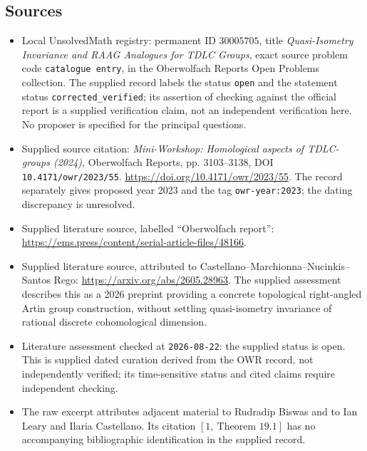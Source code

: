 \documentclass[11pt]{article}
\begin{document}
\subsection{Sources}
\begin{itemize}
\item Local UnsolvedMath registry: permanent ID \(30005705\), title \emph{Quasi-Isometry Invariance and RAAG Analogues for TDLC Groups}, exact source problem code \texttt{catalogue entry}, in the Oberwolfach Reports Open Problems collection. The supplied record labels the status \texttt{open} and the statement status \texttt{corrected\_verified}; its assertion of checking against the official report is a supplied verification claim, not an independent verification here. No proposer is specified for the principal questions.
\item Supplied source citation: \emph{Mini-Workshop: Homological aspects of TDLC-groups (2024)}, Oberwolfach Reports, pp. 3103--3138, DOI \texttt{10.4171/owr/2023/55}. \url{https://doi.org/10.4171/owr/2023/55}. The record separately gives proposed year 2023 and the tag \texttt{owr-year:2023}; the dating discrepancy is unresolved.
\item Supplied literature source, labelled ``Oberwolfach report'': \url{https://ems.press/content/serial-article-files/48166}.
\item Supplied literature source, attributed to Castellano--Marchionna--Nucinkis--Santos Rego: \url{https://arxiv.org/abs/2605.28963}. The supplied assessment describes this as a 2026 preprint providing a concrete topological right-angled Artin group construction, without settling quasi-isometry invariance of rational discrete cohomological dimension.
\item Literature assessment checked at \texttt{2026-08-22}: the supplied status is open. This is supplied dated curation derived from the OWR record, not independently verified; its time-sensitive status and cited claims require independent checking.
\item The raw excerpt attributes adjacent material to Rudradip Biswas and to Ian Leary and Ilaria Castellano. Its citation \([1,\ \text{Theorem }19.1]\) has no accompanying bibliographic identification in the supplied record.
\end{itemize}
\end{document}
